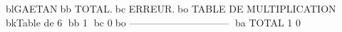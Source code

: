blGAETANbb           TOTAL.bc      ERREUR.bo
TABLE DE MULTIPLICATION
bkTable de   6     bb  1	bc        0bo
------------------------------
ba TOTAL             1	        0
